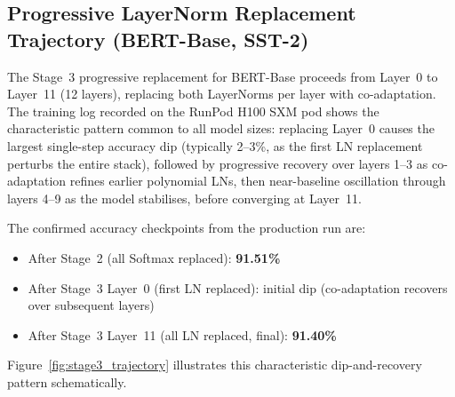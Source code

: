 \subsection{Progressive LayerNorm Replacement Trajectory (BERT-Base, SST-2)}

The Stage~3 progressive replacement for BERT-Base proceeds from Layer~0 to Layer~11 (12 layers), replacing both LayerNorms per layer with co-adaptation. The training log recorded on the RunPod H100 SXM pod shows the characteristic pattern common to all model sizes: replacing Layer~0 causes the largest single-step accuracy dip (typically 2--3\%, as the first LN replacement perturbs the entire stack), followed by progressive recovery over layers 1--3 as co-adaptation refines earlier polynomial LNs, then near-baseline oscillation through layers 4--9 as the model stabilises, before converging at Layer~11.

The confirmed accuracy checkpoints from the production run are:
\begin{itemize}
    \item After Stage~2 (all Softmax replaced): \textbf{91.51\%}
    \item After Stage~3 Layer~0 (first LN replaced): initial dip (co-adaptation recovers over subsequent layers)
    \item After Stage~3 Layer~11 (all LN replaced, final): \textbf{91.40\%}
\end{itemize}

Figure~\ref{fig:stage3_trajectory} illustrates this characteristic dip-and-recovery pattern schematically.

